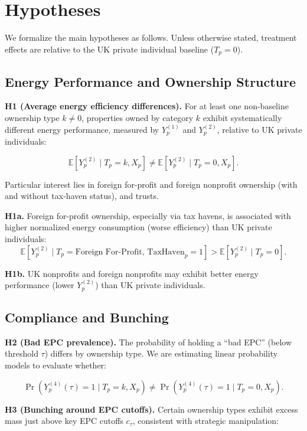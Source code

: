 \documentclass[12pt]{article}
\begin{document}
\section{Hypotheses}

We formalize the main hypotheses as follows. Unless otherwise stated, treatment effects are relative to the UK private individual baseline ($T_p=0$).

\subsection{Energy Performance and Ownership Structure}

\textbf{H1 (Average energy efficiency differences).} 
For at least one non-baseline ownership type $k \neq 0$, properties owned by category $k$ exhibit systematically different energy performance, measured by $Y^{(1)}_p$ and $Y^{(2)}_p$, relative to UK private individuals:

\[
\mathbb{E}[Y^{(2)}_p \mid T_p = k, X_p] \neq \mathbb{E}[Y^{(2)}_p \mid T_p = 0, X_p].
\]

Particular interest lies in foreign for-profit and foreign nonprofit ownership (with and without tax-haven status), and trusts.

\textbf{H1a.} Foreign for-profit ownership, especially via tax havens, is associated with higher normalized energy consumption (worse efficiency) than UK private individuals:
\[
\mathbb{E}[Y^{(2)}_p \mid T_p = \text{Foreign For-Profit, TaxHaven}_p=1] >
\mathbb{E}[Y^{(2)}_p \mid T_p = 0].
\]

\textbf{H1b.} UK nonprofits and foreign nonprofits may exhibit better energy performance (lower $Y^{(2)}_p$) than UK private individuals.

\subsection{Compliance and Bunching}

\textbf{H2 (Bad EPC prevalence).} 
The probability of holding a ``bad EPC'' (below threshold $\tau$) differs by ownership type. We are estimating linear probability models to evaluate whether:

\[
\Pr\left(Y^{(4)}_p(\tau)=1 \mid T_p = k, X_p\right) \neq
\Pr\left(Y^{(4)}_p(\tau)=1 \mid T_p = 0, X_p\right).
\]

\textbf{H3 (Bunching around EPC cutoffs).}
Certain ownership types exhibit excess mass just above key EPC cutoffs $c_\tau$, consistent with strategic manipulation:
\end{document}
